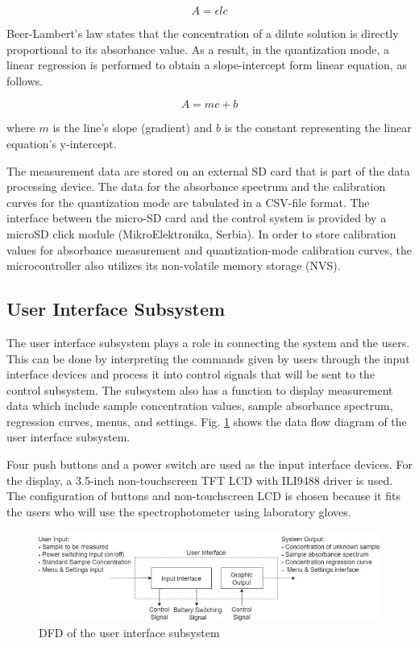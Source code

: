 \documentclass[conference]{IEEEtran}
\begin{document}
    \begin{equation}
    A={\epsilon}{l}{c}
    \label{beer-lambert}
    \end{equation}

Beer-Lambert's law states that the concentration of a dilute solution is directly proportional to its absorbance value.
As a result, in the quantization mode, a linear regression is performed to obtain a slope-intercept form linear equation, as follows. 

    \begin{equation}
    A={m}{c}+{b}
    \label{linear-eq}
    \end{equation}

where $m$ is the line's slope (gradient) and $b$ is the constant representing the linear equation's y-intercept.

The measurement data are stored on an external SD card that is part of the data processing device.
The data for the absorbance spectrum and the calibration curves for the quantization mode are tabulated in a CSV-file format.
The interface between the micro-SD card and the control system is provided by a microSD click module (MikroElektronika, Serbia).
In order to store calibration values for absorbance measurement and quantization-mode calibration curves, the microcontroller also utilizes its non-volatile memory storage (NVS).

\subsection{User Interface Subsystem}
The user interface subsystem plays a role in connecting the system and the users.
This can be done by interpreting the commands given by users through the input interface devices and process it into control signals that will be sent to the control subsystem.
The subsystem also has a function to display measurement data which include sample concentration values, sample absorbance spectrum, regression curves, menus, and settings.
Fig. \ref{ui-dfd} shows the data flow diagram of the user interface subsystem.

Four push buttons and a power switch are used as the input interface devices.
For the display, a 3.5-inch non-touchscreen TFT LCD with ILI9488 driver is used.
The configuration of buttons and non-touchscreen LCD is chosen because it fits the users who will use the spectrophotometer using laboratory gloves.

    \begin{figure}[htbp]
    \centerline{\includegraphics[scale=0.43]{ui-dfd.png}}
    \caption{DFD of the user interface subsystem}
    \label{ui-dfd}
    \end{figure}
\end{document}
